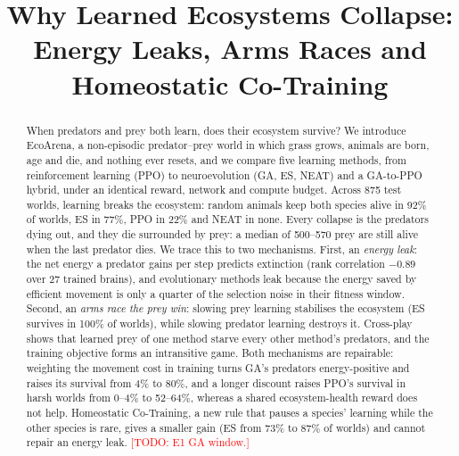 \documentclass[conference]{IEEEtran}
\newcommand{\todo}[1]{\textcolor{red}{[TODO: #1]}}
\begin{document}
\title{Why Learned Ecosystems Collapse:\\Energy Leaks, Arms Races and Homeostatic Co-Training}

\author{
}

\maketitle

\begin{abstract}
When predators and prey both learn, does their ecosystem survive? We introduce EcoArena, a non-episodic predator--prey world in which grass grows, animals are born, age and die, and nothing ever resets, and we compare five learning methods, from reinforcement learning (PPO) to neuroevolution (GA, ES, NEAT) and a GA-to-PPO hybrid, under an identical reward, network and compute budget. Across 875 test worlds, learning breaks the ecosystem: random animals keep both species alive in 92\% of worlds, ES in 77\%, PPO in 22\% and NEAT in none. Every collapse is the predators dying out, and they die surrounded by prey: a median of 500--570 prey are still alive when the last predator dies. We trace this to two mechanisms. First, an \emph{energy leak}: the net energy a predator gains per step predicts extinction (rank correlation $-0.89$ over 27 trained brains), and evolutionary methods leak because the energy saved by efficient movement is only a quarter of the selection noise in their fitness window. Second, an \emph{arms race the prey win}: slowing prey learning stabilises the ecosystem (ES survives in 100\% of worlds), while slowing predator learning destroys it. Cross-play shows that learned prey of one method starve every other method's predators, and the training objective forms an intransitive game. Both mechanisms are repairable: weighting the movement cost in training turns GA's predators energy-positive and raises its survival from 4\% to 80\%, and a longer discount raises PPO's survival in harsh worlds from 0--4\% to 52--64\%, whereas a shared ecosystem-health reward does not help. Homeostatic Co-Training, a new rule that pauses a species' learning while the other species is rare, gives a smaller gain (ES from 73\% to 87\% of worlds) and cannot repair an energy leak. \todo{E1 GA window.}
\end{abstract}
\end{document}
